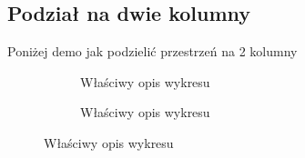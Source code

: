 \documentclass[
  a4paper,
  DIV=11,
  numbers=noendperiod,
  oneside,
  open=any]{scrreprt}
\begin{document}
\subsection{Podział na dwie kolumny}\label{podziaux142-na-dwie-kolumny}

Poniżej demo jak podzielić przestrzeń na 2 kolumny

\begin{figure}

\begin{minipage}{0.50\linewidth}

\begin{figure}[H]


\caption{\label{fig-obraz1}Właściwy opis wykresu}

\end{figure}%

\end{minipage}%
%
\begin{minipage}{0.50\linewidth}

\begin{figure}[H]


\caption{\label{fig-obraz2}Właściwy opis wykresu}

\end{figure}%

\end{minipage}%

\end{figure}%
\end{document}
